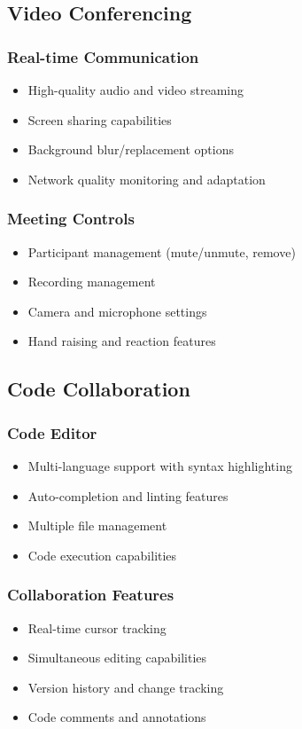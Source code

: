\documentclass[12pt,a4paper]{report}
\begin{document}
\subsection{Video Conferencing}
\subsubsection{Real-time Communication}
\begin{itemize}
   \item High-quality audio and video streaming
   \item Screen sharing capabilities
   \item Background blur/replacement options
   \item Network quality monitoring and adaptation
\end{itemize}

\subsubsection{Meeting Controls}
\begin{itemize}
   \item Participant management (mute/unmute, remove)
   \item Recording management
   \item Camera and microphone settings
   \item Hand raising and reaction features
\end{itemize}

\subsection{Code Collaboration}
\subsubsection{Code Editor}
\begin{itemize}
   \item Multi-language support with syntax highlighting
   \item Auto-completion and linting features
   \item Multiple file management
   \item Code execution capabilities
\end{itemize}

\subsubsection{Collaboration Features}
\begin{itemize}
   \item Real-time cursor tracking
   \item Simultaneous editing capabilities
   \item Version history and change tracking
   \item Code comments and annotations
\end{itemize}
\end{document}
